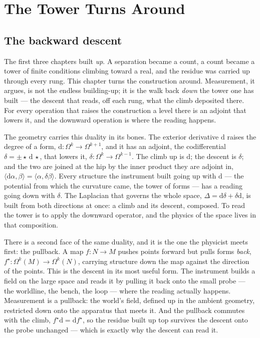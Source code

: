 \chapter{The Tower Turns Around}

\section{The backward descent}

The first three chapters built \emph{up}. A separation became a count, a count became a tower of finite conditions climbing
toward a real, and the residue was carried up through every rung. This chapter turns the construction around. Measurement, it
argues, is not the endless building-up; it is the walk back \emph{down} the tower one has built --- the descent that reads,
off each rung, what the climb deposited there. For every operation that raises the construction a level there is an adjoint
that lowers it, and the downward operation is where the reading happens.

The geometry carries this duality in its bones. The exterior derivative $\mathrm{d}$ raises the degree of a form,
$\mathrm{d} : \Omega^k \to \Omega^{k+1}$, and it has an adjoint, the codifferential $\delta = \pm \star\,\mathrm{d}\,\star$,
that lowers it, $\delta : \Omega^{k} \to \Omega^{k-1}$. The climb up is $\mathrm{d}$; the descent is $\delta$; and the two
are joined at the hip by the inner product they are adjoint in, $\langle \mathrm{d}\alpha, \beta \rangle = \langle \alpha,
\delta\beta \rangle$. Every structure the instrument built going up with $\mathrm{d}$ --- the potential from which the
curvature came, the tower of forms --- has a reading going down with $\delta$. The Laplacian that governs the whole space,
$\Delta = \mathrm{d}\delta + \delta\mathrm{d}$, is built from both directions at once: a climb and its descent, composed. To
read the tower is to apply the downward operator, and the physics of the space lives in that composition.

There is a second face of the same duality, and it is the one the physicist meets first: the pullback. A map $f : N \to M$
pushes points forward but pulls forms \emph{back}, $f^\star : \Omega^k(M) \to \Omega^k(N)$, carrying structure down the map
against the direction of the points. This is the descent in its most useful form. The instrument builds a field on the large
space and reads it by pulling it back onto the small probe --- the worldline, the bench, the loop --- where the reading
actually happens. Measurement is a pullback: the world's field, defined up in the ambient geometry, restricted down onto the
apparatus that meets it. And the pullback commutes with the climb, $f^\star \mathrm{d} = \mathrm{d} f^\star$, so the residue
built up top survives the descent onto the probe unchanged --- which is exactly why the descent can read it.

